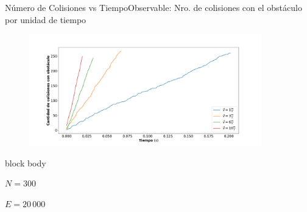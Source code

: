 \documentclass{beamer}
\begin{document}
            \begin{frame}{Número de Colisiones vs Tiempo}{Observable: Nro. de colisiones con el obstáculo por unidad de tiempo}
                \begin{figure}[H!]
                    \includegraphics[width=0.9\textwidth]{./total_collisions_vs_time}
                    \label{fig:slope_1}
                \end{figure}
                \begin{beamercolorbox}[sep=5pt,center]{block body}
                    \begin{minipage}[t]{0.45\textwidth}
                        \centering
                        \small{$N=300$}
                    \end{minipage}
                    \hfill
                    \begin{minipage}[t]{0.45\textwidth}
                        \centering
                        \small{$E=20\,000$}
                    \end{minipage}
                \end{beamercolorbox}
            \end{frame}
\end{document}
